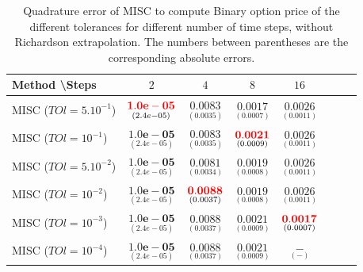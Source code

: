 \documentclass[11pt]{article}
\begin{document}
\begin{table}[h!]
	\centering
	\begin{tabular}{l*{6}{c}r}
		Method \textbackslash  Steps            & $2$ & $4$ & $8$ & $16$  \\
		\hline
		MISC ($TOl=5.10^{-1}$)  & $\underset{(2.4e-05)}{\mathbf{{\color{red}1.0e-05}}}$ & $\underset{(0.0035)}{\mathbf{0.0083}}$  & $\underset{(0.0007)}{\mathbf{ 0.0017}}$ &$\underset{(0.0011)}{\mathbf{0.0026}}$ \\
		MISC ($TOl=10^{-1}$)   & $\underset{(2.4e-05)}{\mathbf{1.0e-05}}$ & $\underset{(0.0035)}{\mathbf{0.0083}}$ & $\underset{(0.0009)}{\mathbf{{\color{red}0.0021}}}$ & $\underset{(0.0011)}{\mathbf{
				0.0026}}$ \\
		MISC ($TOl=5.10^{-2}$)  & $\underset{(2.4e-05)}{\mathbf{1.0e-05}}$& $\underset{(0.0034)}{\mathbf{0.0081}}$ & $\underset{(0.0008)}{\mathbf{ 0.0019}}$& $\underset{(0.0011)}{\mathbf{
				0.0026}}$ \\
		MISC ($TOl=10^{-2}$)  & $\underset{(2.4e-05)}{\mathbf{1.0e-05}}$ & $\underset{(0.0037)}{\mathbf{{\color{red}0.0088}}}$ & $\underset{(0.0008)}{\mathbf{ 0.0019}}$ & $\underset{(0.0011)}{\mathbf{
				0.0026}}$ \\
		MISC ($TOl=10^{-3}$)  & $\underset{(2.4e-05)}{\mathbf{1.0e-05}}$ & $\underset{(0.0037)}{\mathbf{0.0088}}$& $\underset{(0.0009)}{\mathbf{0.0021}}$& $\underset{(0.0007)}{\mathbf{{\color{red} 0.0017}}}$ \\
			MISC ($TOl=10^{-4}$)  & $\underset{(2.4e-05)}{\mathbf{1.0e-05}}$ & $\underset{(0.0037)}{\mathbf{0.0088}}$& $\underset{(0.0009)}{\mathbf{0.0021}}$& $\underset{(-)}{\mathbf{ -}}$ \\
		\hline
	\end{tabular}
	\caption{Quadrature error of MISC to compute Binary option price of the different tolerances for different number of time steps, without Richardson extrapolation. The numbers between parentheses are the corresponding absolute errors.}
	\label{Quadrature error of MISC to compute Binary option price of the different tolerances for different number of time steps, without Richardson extrapolation. The numbers between parentheses are the corresponding absolute errors.}
\end{table}
\end{document}
